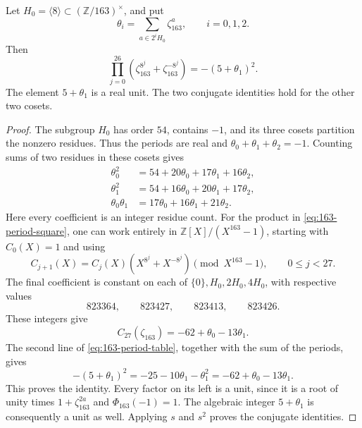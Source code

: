 \begin{lemma}
\label{lem:163-period-unit-square}
Let \(H_0=\langle8\rangle\subset(\mathbb Z/163)^\times\),
and put
\[
 \theta_i=\sum_{a\in2^iH_0}\zeta_{163}^a,\qquad i=0,1,2.
\]
Then
\begin{equation}
 \prod_{j=0}^{26}
      (\zeta_{163}^{8^j}+\zeta_{163}^{-8^j})
            =-(5+\theta_1)^2.
 \label{eq:163-period-square}
\end{equation}
The element \(5+\theta_1\) is a real unit.
The two conjugate identities hold for the other two cosets.
\end{lemma}
\begin{proof}
The subgroup \(H_0\) has order \(54\), contains \(-1\),
and its three cosets partition the nonzero residues.
Thus the periods are real and
\(\theta_0+\theta_1+\theta_2=-1\).
Counting sums of two residues in these cosets gives
\begin{equation}
\begin{aligned}
 \theta_0^2&=54+20\theta_0+17\theta_1+16\theta_2,\\
 \theta_1^2&=54+16\theta_0+20\theta_1+17\theta_2,\\
 \theta_0\theta_1&=17\theta_0+16\theta_1+21\theta_2.
\end{aligned}
 \label{eq:163-period-table}
\end{equation}
Here every coefficient is an integer residue count.
For the product in \eqref{eq:163-period-square}, one can
work entirely in \(\mathbb Z[X]/(X^{163}-1)\), starting
with \(C_0(X)=1\) and using
\[
 C_{j+1}(X)=C_j(X)(X^{8^j}+X^{-8^j})
                     \pmod{X^{163}-1},\qquad0\leq j<27.
\]
The final coefficient is constant on each of
\(\{0\},H_0,2H_0,4H_0\), with respective values
\[
 823364,\qquad823427,\qquad823413,\qquad823426.
\]
These integers give
\[
 C_{27}(\zeta_{163})=-62+\theta_0-13\theta_1.
\]
The second line of \eqref{eq:163-period-table}, together
with the sum of the periods, gives
\[
 -(5+\theta_1)^2
  =-25-10\theta_1-\theta_1^2
  =-62+\theta_0-13\theta_1.
\]
This proves the identity. Every factor on its left is
a unit, since it is a root of unity times
\(1+\zeta_{163}^{2a}\) and \(\Phi_{163}(-1)=1\).
The algebraic integer \(5+\theta_1\) is consequently a
unit as well. Applying \(s\) and \(s^2\) proves the
conjugate identities.
\end{proof}

